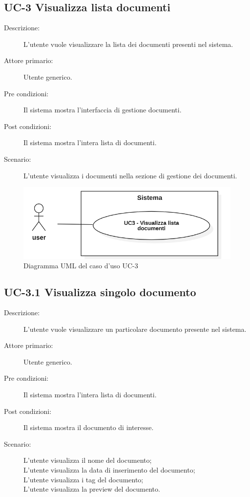 \subsection{UC-3 Visualizza lista documenti}
\begin{description}
    \item[Descrizione:] L’utente vuole visualizzare la lista dei documenti presenti nel sistema.
    \item[Attore primario:] Utente generico.
    \item[Pre condizioni:] Il sistema mostra l’interfaccia di gestione documenti.
    \item[Post condizioni:] Il sistema mostra l’intera lista di documenti.
    \item[Scenario:] L’utente visualizza i documenti nella sezione di gestione dei documenti.
\end{description}

\begin{figure}[H]
    \centering
    \includegraphics[width=0.8\linewidth]{UC3.PNG}
    \caption{Diagramma UML del caso d'uso UC-3}
    \label{fig:UC3}
\end{figure}

\subsection{UC-3.1 Visualizza singolo documento}
\begin{description}
    \item[Descrizione:] L'utente vuole visualizzare un particolare documento presente nel sistema.
    \item[Attore primario:] Utente generico.
    \item[Pre condizioni:] Il sistema mostra l’intera lista di documenti.
    \item[Post condizioni:] Il sistema mostra il documento di interesse.
    \item[Scenario:] L'utente visualizza il nome del documento;\\L'utente visualizza la data di inserimento del documento;\\L'utente visualizza i tag del documento;\\L'utente visualizza la preview del documento.
\end{description}

